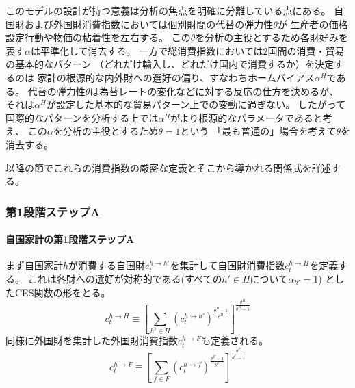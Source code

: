 このモデルの設計が持つ意義は分析の焦点を明確に分離している点にある。
自国財および外国財消費指数においては個別財間の代替の弾力性\(\theta\)が
生産者の価格設定行動や物価の粘着性を左右する。
この\(\theta\)を分析の主役とするため各財好みを表す\(\alpha\)は平準化して消去する。
一方で総消費指数においては2国間の消費・貿易の基本的なパターン
（どれだけ輸入し、どれだけ国内で消費するか）を決定するのは
家計の根源的な内外財への選好の偏り、すなわちホームバイアス\(\alpha^H\)である。
代替の弾力性\(\theta\)は為替レートの変化などに対する反応の仕方を決めるが、
それは\(\alpha^H\)が設定した基本的な貿易パターン上での変動に過ぎない。
したがって国際的なパターンを分析する上では\(\alpha^H\)がより根源的なパラメータであると考え、
この\(\alpha\)を分析の主役とするため\(\theta=1\)という
「最も普通の」場合を考えて\(\theta\)を消去する。

以降の節でこれらの消費指数の厳密な定義とそこから導かれる関係式を詳述する。

\subsubsection{第1段階ステップA}
\label{sec:model_households_indices_aggregation_stage1a}

\paragraph{自国家計の第1段階ステップA}
\label{sec:model_households_indices_aggregation_stage1a_home}
まず自国家計\(h\)が消費する自国財\(c_t^{h\to h'}\)を集計して自国財消費指数\(c_t^{h\to H}\)を定義する。
これは各財への選好が対称的である(すべての\(h'\in H\)について\(\alpha_{h'}=1\)) としたCES関数の形をとる。
\begin{equation}
\label{form:model_households_indices_aggregation_stage1a_c_h_H_def}
    c_t^{h\to H}\equiv\left[\sum_{h'\in H}(c_t^{h\to h'})^{\frac{\theta^H-1}{\theta^H}}\right]^{\frac{\theta^H}{\theta^H-1}}
\end{equation}
同様に外国財を集計した外国財消費指数\(c_t^{h\to F}\)も定義される。
\begin{equation}
\label{form:model_households_indices_aggregation_stage1a_c_f_F_def}
    c_t^{h\to F}\equiv\left[\sum_{f\in F}(c_t^{h\to f})^{\frac{\theta^F-1}{\theta^F}}\right]^{\frac{\theta^F}{\theta^F-1}}
\end{equation}

